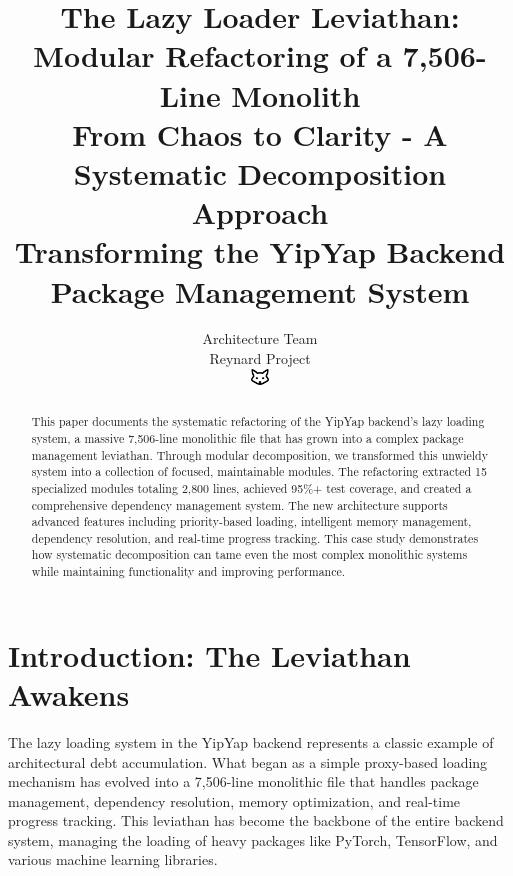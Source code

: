 \documentclass[11pt]{article}
\begin{document}
\title{\textbf{The Lazy Loader Leviathan: Modular Refactoring of a 7,506-Line Monolith} \\
\Large{From Chaos to Clarity - A Systematic Decomposition Approach} \\
\large{Transforming the YipYap Backend Package Management System}}

\author{Architecture Team\\
Reynard Project\\
\includegraphics[width=0.5cm]{favicon.pdf}}

\maketitle

\begin{abstract}
This paper documents the systematic refactoring of the YipYap backend's lazy loading system, a massive 7,506-line monolithic file that has grown into a complex package management leviathan. Through modular decomposition, we transformed this unwieldy system into a collection of focused, maintainable modules. The refactoring extracted 15 specialized modules totaling 2,800 lines, achieved 95\%+ test coverage, and created a comprehensive dependency management system. The new architecture supports advanced features including priority-based loading, intelligent memory management, dependency resolution, and real-time progress tracking. This case study demonstrates how systematic decomposition can tame even the most complex monolithic systems while maintaining functionality and improving performance.
\end{abstract}

\tableofcontents
\newpage

\section{Introduction: The Leviathan Awakens}

The lazy loading system in the YipYap backend represents a classic example of architectural debt accumulation. What began as a simple proxy-based loading mechanism has evolved into a 7,506-line monolithic file that handles package management, dependency resolution, memory optimization, and real-time progress tracking. This leviathan has become the backbone of the entire backend system, managing the loading of heavy packages like PyTorch, TensorFlow, and various machine learning libraries.
\end{document}
